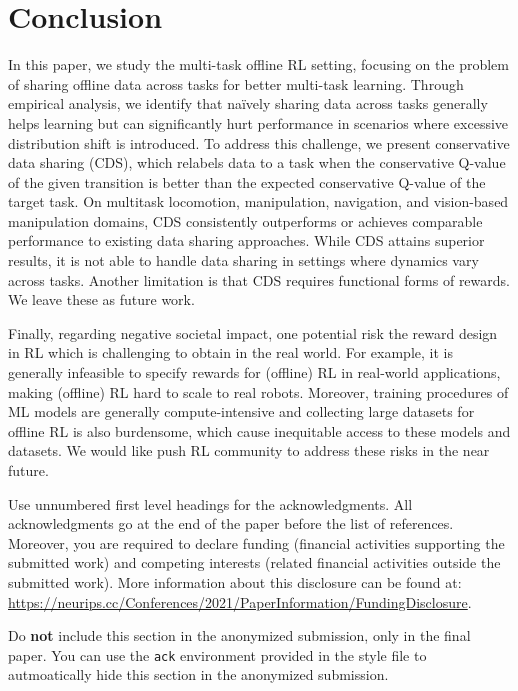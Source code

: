 \documentclass{article}
\begin{document}
\section{Conclusion}
\vspace{-5pt}
\label{sec:conclusion}
In this paper, we study the multi-task offline RL setting, focusing on the problem of sharing offline data across tasks for better multi-task learning. Through empirical analysis, we identify that na\"{i}vely sharing data across tasks generally helps learning but can significantly hurt performance in scenarios where excessive distribution shift is introduced. To address this challenge, we present conservative data sharing (CDS), which relabels data to a task when the conservative Q-value of the given transition is better than the expected conservative Q-value of the target task. On multitask locomotion, manipulation, navigation, and vision-based manipulation domains, CDS consistently outperforms or achieves comparable performance to existing data sharing approaches. While CDS attains superior results, it is not able to handle data sharing in settings where dynamics vary across tasks. Another limitation is that CDS requires functional forms of rewards. We leave these as future work. 

Finally, regarding negative societal impact, one potential risk the reward design in RL which is challenging to obtain in the real world. For example, it is generally infeasible to specify rewards for (offline) RL in real-world applications, making (offline) RL hard to scale to real robots. Moreover, training procedures of ML models are generally compute-intensive and collecting large datasets for offline RL is also burdensome, which cause inequitable access to these models and datasets.  We would like push RL community to address these risks in the near future.

\begin{ack}
Use unnumbered first level headings for the acknowledgments. All acknowledgments
go at the end of the paper before the list of references. Moreover, you are required to declare
funding (financial activities supporting the submitted work) and competing interests (related financial activities outside the submitted work).
More information about this disclosure can be found at: \url{https://neurips.cc/Conferences/2021/PaperInformation/FundingDisclosure}.

Do {\bf not} include this section in the anonymized submission, only in the final paper. You can use the \texttt{ack} environment provided in the style file to autmoatically hide this section in the anonymized submission.
\end{ack}
\end{document}
